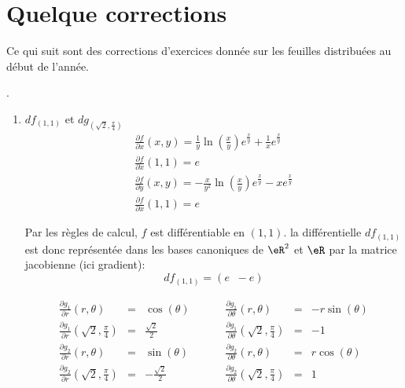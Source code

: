 
                    \section{Quelque corrections}

Ce qui suit sont des corrections d'exercices donnée sur les feuilles distribuées au début de l'année.

.
\begin{enumerate}
\item $df_{(1,1)}$ et $dg_{(\sqrt2,\frac{\pi}{4})}$\\
    \[\begin{array}{l}\frac{ \partial f }{ \partial x }(x,y) = \frac{1}{y}\ln(\frac{x}{y})e^{\frac{x}{y}}+\frac{1}{x}e^{\frac{x}{y}}\\
            \frac{ \partial f }{ \partial x }(1,1)=e\\
            \frac{ \partial f }{ \partial y }(x,y)=-\frac{x}{y^2}\ln(\frac{x}{y})e^{\frac{x}{y}}-xe^{\frac{x}{y}}\\
        \frac{ \partial f }{ \partial x }(1,1)=e\end{array}\]
            
 \noindent Par les règles de calcul, $f$ est différentiable en $(1,1)$. la différentielle $df_{(1,1)}$ est donc représentée dans les bases canoniques de $\eR^2$ et $\eR$ par la matrice jacobienne (ici gradient):\[df_{(1,1)}=(e \;\; -e)\]
 
 \[\begin{array}{lclllllcl}\frac{ \partial g_1 }{ \partial r }(r,\theta) &=&\cos(\theta)& & & & \frac{ \partial g_1 }{ \partial \theta }(r,\theta)   & =&-r\sin(\theta)\\
         \frac{ \partial g_1 }{ \partial r }(\sqrt2, \frac{\pi}{4})&=&\frac{\sqrt2}{2}& & &&\frac{ \partial g_1 }{ \partial \theta }(\sqrt2, \frac{\pi}{4})& =&-1 \\
         \frac{ \partial g_2 }{ \partial r }(r,\theta) &=&\sin(\theta)&  && &\frac{ \partial g_2 }{ \partial \theta }(r,\theta)  &=&r\cos(\theta) \\
     \frac{ \partial g_2 }{ \partial r }(\sqrt2, \frac{\pi}{4})&=&-\frac{\sqrt2}{2}&& & &\frac{ \partial g_2 }{ \partial \theta }(\sqrt2, \frac{\pi}{4})& = &1\end{array}\]


\end{enumerate}
